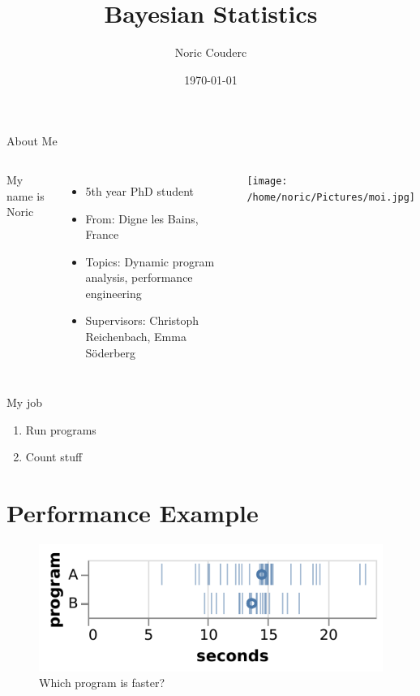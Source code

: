 \documentclass[aspectratio=169,xcolor=svgnames]{beamer}
\title[]{Bayesian Statistics}
\author{Noric Couderc}
\date{\today}
\institute{Lund University\\Department of Computer Science}
\begin{document}
\maketitle

\begin{frame}{About Me}
  \begin{columns}
    My name is Noric

    \begin{itemize}
    \item 5th year PhD student
    \item From: Digne les Bains, France
    \item Topics: Dynamic program analysis, performance engineering
    \item Supervisors: Christoph Reichenbach, Emma Söderberg
    \end{itemize}

    \texttt{[image: /home/noric/Pictures/moi.jpg]}

  \end{columns}
\end{frame}

\begin{frame}
  \begin{block}{My job}
  \begin{enumerate}
  \item <2->Run programs
  \item <3->Count stuff
  \end{enumerate}
  \end{block}
\end{frame}

\section{Performance Example}

\begin{frame}
  \begin{figure}[ht]
    \centering
    \includegraphics[width=\textwidth]{figures/samples_a_b.pdf}
    \caption{Which program is faster?}
  \end{figure}
\end{frame}
\end{document}
